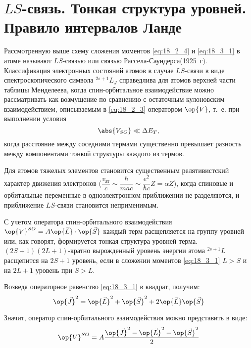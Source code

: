\section{$LS$-связь. Тонкая структура уровней. Правило интервалов Ланде}

Рассмотренную выше схему сложения моментов \eqref{eq:18_2_4} и \eqref{eq:18_3_1} в атоме называют $LS$-связью  или связью Рассела-Саундерса\footnotemark (1925~г). Классификация электронных состояний атомов в случае $LS$-связи в виде спектроскопического символа $^{2s+1}L_J$ справедлива для атомов верхней части таблицы Менделеева\footnotemark, когда спин-орбитальное взаимодействие можно рассматривать как возмущение по сравнению с остаточным кулоновским взаимодействием, описываемым в \eqref{eq:18_2_3} оператором $\op{V}$, т.~е. при выполнении условия
%
\begin{equation}
\label{eq:18_4_1}
\abs{V_{SO}} \ll \Delta E_T,
\end{equation}
когда расстояние между соседними термами существенно превышает разность между компонентами тонкой структуры каждого из термов.
 
Для атомов тяжелых элементов становится существенным релятивистский характер движения электронов ($\dfrac{v_{\text{ат}}}{c} \sim \dfrac{\hbar}{m a c} \sim \dfrac{e^2}{\hbar c} Z = \alpha Z$), когда спиновые и орбитальные переменные в одноэлектронном приближении не разделяются, и приближение $LS$-связи становится неприменимым.

С учетом оператора спин-орбитального взаимодействия $\op{V}^{SO} = A \op{\vec{L}} \cdot \op{\vec{S}}$ каждый терм расщепляется на группу уровней или, как говорят, формируется тонкая структура уровней терма. $(2S + 1)(2L+1)$-кратно вырожденный уровень энергии атома $^{2s+1}L$ расщепится на $2S+1$ уровень, если в сложении моментов \eqref{eq:18_3_1} $L > S$ и на $2L+1$ уровень при $S > L$. 

Возведя операторное равенство \eqref{eq:18_3_1} в квадрат, получим:
$$
\op{\vec{J}}^2 = \op{\vec{L}}^2 + \op{\vec{S}}^2 + 2\op{\vec{L}}\op{\vec{S}}
$$

Значит, оператор спин-орбитального взаимодействия можно представить в виде:
\begin{equation}
\label{eq:18_4_2}
\op{V}^{SO} = A\frac{\op{\vec{J}}^2 - \op{\vec{L}}^2 - \op{\vec{S}}^2}{2}
\end{equation}


